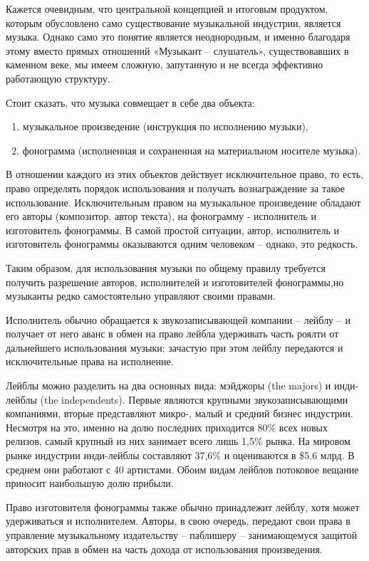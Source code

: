 \documentclass[12pt]{report}
\begin{document}
\begin{multicols}{2}
Кажется очевидным, что центральной концепцией и итоговым продуктом, которым обусловлено само существование музыкальной индустрии, является музыка. Однако само это понятие является неоднородным, и именно благодаря этому вместо прямых отношений «Музыкант – слушатель», существовавших в каменном веке, мы имеем сложную, запутанную и не всегда эффективно работающую структуру.

Стоит сказать, что музыка совмещает в себе два объекта:
\begin{enumerate}
	\item музыкальное произведение (инструкция по исполнению музыки), 
	\item фонограмма (исполненная и сохраненная на материальном носителе музыка).
\end{enumerate}

В отношении каждого из этих объектов действует исключительное право, то есть, право определять порядок использования и получать вознаграждение за такое использование. Исключительным правом на музыкальное произведение обладают его авторы (композитор, автор текста), на фонограмму - исполнитель и изготовитель фонограммы. В самой простой ситуации, автор, исполнитель и изготовитель фонограммы оказываются одним человеком – однако, это редкость.

Таким образом, для использования музыки по общему правилу требуется получить разрешение авторов, исполнителей и изготовителей фонограммы,но музыканты редко самостоятельно управляют своими правами. 

Исполнитель обычно обращается к звукозаписывающей компании – лейблу – и получает от него аванс в обмен на право лейбла удерживать часть роялти от дальнейшего использования музыки; зачастую при этом лейблу передаются и исключительные права на исполнение. 

Лейблы можно разделить на два основных вида: мэйджоры (the majors) и инди-лейблы (the independents). Первые являются крупными звукозаписывающими компаниями, вторые представляют микро-, малый и средний бизнес индустрии. Несмотря на это, именно на долю последних приходится 80\% всех новых релизов,  самый крупный из них занимает всего лишь 1,5\% рынка. На мировом рынке индустрии инди-лейблы составляют 37,6\% и оцениваются в \$5.6 млрд. В среднем они работают с 40 артистами. Обоим видам лейблов потоковое вещание приносит  наибольшую долю прибыли. 

Право изготовителя фонограммы также обычно принадлежит лейблу, хотя может удерживаться и исполнителем. Авторы, в свою очередь, передают свои права в управление музыкальному издательству – паблишеру – занимающемуся защитой авторских прав в обмен на часть дохода от использования произведения. 


\end{multicols}
\end{document}
